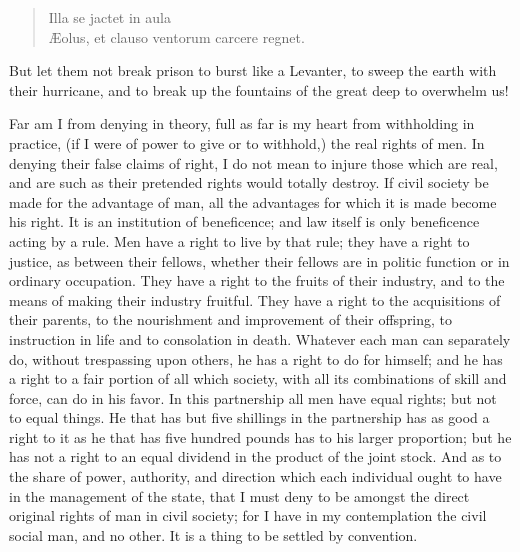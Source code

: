 \begin{verse}
\hspace{1in}Illa se jactet in aula \\
Æolus, et clauso ventorum carcere regnet.
\end{verse}

But let them not break prison to burst like a Levanter, to sweep the earth with their hurricane, and to break up the fountains of the great deep to overwhelm us!

Far am I from denying in theory, full as far is my heart from withholding in practice, (if I were of power to give or to withhold,) the real rights of men. In denying their false claims of right, I do not mean to injure those which are real, and are such as their pretended rights would totally destroy. If civil society be made for the advantage of man, all the advantages for which it is made become his right. It is an institution of beneficence; and law itself is only beneficence acting by a rule. Men have a right to live by that rule; they have a right to justice, as between their fellows, whether their fellows are in politic function or in ordinary occupation. They have a right to the fruits of their industry, and to the means of making their industry fruitful. They have a right to the acquisitions of their parents, to the nourishment and improvement of their offspring, to instruction in life and to consolation in death. Whatever each man can separately do, without trespassing upon others, he has a right to do for himself; and he has a right to a fair portion of all which society, with all its combinations of skill and force, can do in his favor. In this partnership all men have equal rights; but not to equal things. He that has but five shillings in the partnership has as good a right to it as he that has five hundred pounds has to his larger proportion; but he has not a right to an equal dividend in the product of the joint stock. And as to the share of power, authority, and direction which each individual ought to have in the management of the state, that I must deny to be amongst the direct original rights of man in civil society; for I have in my contemplation the civil social man, and no other. It is a thing to be settled by convention.

